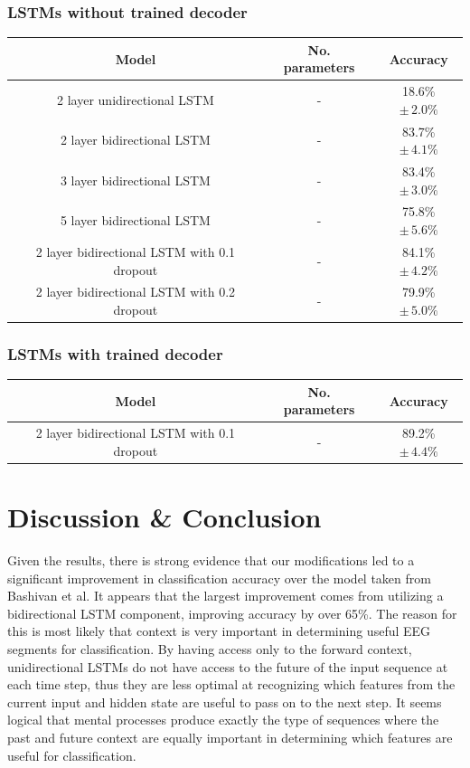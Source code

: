 \documentclass{article}
\begin{document}
\subsubsection{LSTMs without trained decoder}
\begin{center}
\begin{tabular}{ c|c|c } 
 Model & No. parameters & Accuracy \\ 
 \hline
 2 layer unidirectional LSTM & - & 18.6\% $\pm \, 2.0\% $\\ 
 2 layer bidirectional LSTM & - & 83.7\% $\pm \, 4.1\%$ \\ 
 3 layer bidirectional LSTM & - & 83.4\% $\pm \, 3.0\%$ \\ 
 5 layer bidirectional LSTM & - & 75.8\% $\pm \, 5.6\%$ \\
 2 layer bidirectional LSTM with 0.1 dropout & - & 84.1\% $\pm \, 4.2\%$ \\
 2 layer bidirectional LSTM with 0.2 dropout & - & 79.9\% $\pm \, 5.0\%$ \\
\end{tabular}
\end{center}
\subsubsection{LSTMs with trained decoder}
\begin{center}
\begin{tabular}{ c|c|c } 
 Model & No. parameters & Accuracy \\ 
 \hline
 2 layer bidirectional LSTM with 0.1 dropout & - & 89.2\% $\pm \, 4.4\%$ \\
\end{tabular}
\end{center}

\section{Discussion \& Conclusion}
Given the results, there is strong evidence that our modifications led to a significant improvement in classification accuracy over the model taken from Bashivan et al. It appears that the largest improvement comes from utilizing a bidirectional LSTM component, improving accuracy by over 65\%. The reason for this is most likely that context is very important in determining useful EEG segments for classification. By having access only to the forward context, unidirectional LSTMs do not have access to the future of the input sequence at each time step, thus they are less optimal at recognizing which features from the current input and hidden state are useful to pass on to the next step. It seems logical that mental processes produce exactly the type of sequences where the past and future context are equally important in determining which features are useful for classification. 
\end{document}
